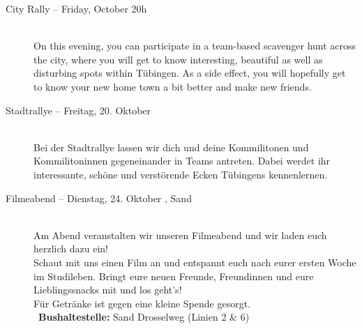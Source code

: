 \begin{description}
\ifml
	\item[City Rally -- Friday, October 20h \YEAR]~\\%
	On this evening, you can participate in a team-based scavenger hunt across the city,
	where you will get to know interesting, beautiful as well as disturbing spots within Tübingen.
	As a side effect, you will hopefully get to know your new home town a bit better and make new friends.
\else
	\item[Stadtrallye -- Freitag, 20. Oktober \YEAR]~\\%
	Bei der Stadtrallye lassen wir dich und deine Kommilitonen und Kommilitoninnen gegeneinander in Teams antreten.
	Dabei werdet ihr interessante, schöne und verstörende Ecken Tübingens kennenlernen.
\fi

\ifbachelor \pagebreak  \fi

\ifml
\else
	\item[Filmeabend -- Dienstag, 24. Oktober \YEAR, Sand]~\\%
	Am Abend veranstalten wir unseren Filmeabend und wir laden euch herzlich dazu ein!\\
	Schaut mit uns einen Film an und entspannt euch nach eurer ersten Woche im Studileben.
	Bringt eure neuen Freunde, Freundinnen und eure Lieblingssnacks mit und los geht's!\\
	Für Getränke ist gegen eine kleine Spende gesorgt.\\
	~\textbf{Bushaltestelle:} Sand Drosselweg (Linien 2 \& 6)
\fi


\end{description}
